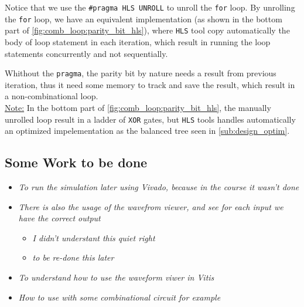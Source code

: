Notice that we use the \verb|#pragma HLS UNROLL| to unroll the \verb|for| loop. By unrolling the \verb|for| loop, we have an equivalent implementation (as shown in the bottom part of \autoref{fig:comb_loop:parity_bit_hls}), where \verb|HLS| tool copy automatically the body of loop statement in each iteration, which result in running the loop statements concurrently and not sequentially.

Whithout the \verb|pragma|, the parity bit by nature needs a result from previous iteration, thus it need some memory to track and save the result, which result in a non-combinational loop.\\

\underline{Note:} In the bottom part of \autoref{fig:comb_loop:parity_bit_hls}, the manually unrolled loop result in a ladder of \verb|XOR| gates, but \verb|HLS| tools handles automatically an optimized impelementation as the balanced tree seen in \ref{sub:design_optim}.


\subsection{Some Work to be done}

 

\begin{itemize}

\item \textit{To run the simulation later using Vivado, because in the course it wasn't done}

\item \textit{There is also the usage of the wavefrom viewer, and see for each input we have the correct output}

	\begin{itemize}
	
	\item \textit{I didn't understant this quiet right}	
		
	\item \textit{to be re-done this later}

	\end{itemize}

\end{itemize}

 

\begin{itemize}

\item \textit{To understand how to use the waveform viwer in Vitis}

\item \textit{How to use with some combinational circuit for example}

\end{itemize}


